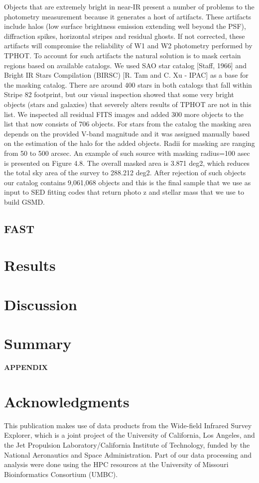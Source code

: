 \documentclass[apj,iop]{emulateapj}
\begin{document}
Objects that are extremely bright in near-IR present a number of problems to the photometry measurement because it generates a host of artifacts. These artifacts include halos (low surface brightness emission extending well beyond the PSF), diffraction spikes, horizontal stripes and residual ghosts. If not corrected, these artifacts will compromise the reliability of W1 and W2 photometry performed by TPHOT. To account for such artifacts the natural solution is to mask certain regions based on available catalogs. We used SAO star catalog [Staff, 1966] and Bright IR Stars Compilation (BIRSC) [R. Tam and C. Xu - IPAC] as a base for the masking catalog. There are around 400 stars in both catalogs that fall within Stripe 82 footprint, but our visual inspection showed that some very bright objects (stars and galaxies) that severely alters results of TPHOT are not in this list. We inspected all residual FITS images and added 300 more objects to the list that now consists of 706 objects. For stars from the catalog the masking area depends on the provided V-band magnitude and it was assigned manually based on the estimation of the halo for the added objects. Radii for masking are ranging from 50 to 500 arcsec. An example of such source with masking radius=100 asec is presented on Figure 4.8. The overall masked area is 3.871 deg2, which reduces the total sky area of the survey to 288.212 deg2.
After rejection of such objects our catalog contains 9,061,068 objects and this is the final sample that we use as input to SED fitting codes that return photo z and stellar mass that we use to build GSMD.
\subsection{FAST} 
	
\section{Results}

\section{Discussion}

\section{Summary}


\acknowledgements


{}
%

\newpage
\centerline{ {\bf APPENDIX}}
\appendix

\section{Acknowledgments}
This publication makes use of data products from the Wide-field Infrared Survey Explorer, which is a joint project of the University of California, Los Angeles, and the Jet Propulsion Laboratory/California Institute of Technology, funded by the National Aeronautics and Space Administration. Part of our data processing and analysis were done using the HPC resources at the University of Missouri Bioinformatics Consortium (UMBC).
\end{document}
